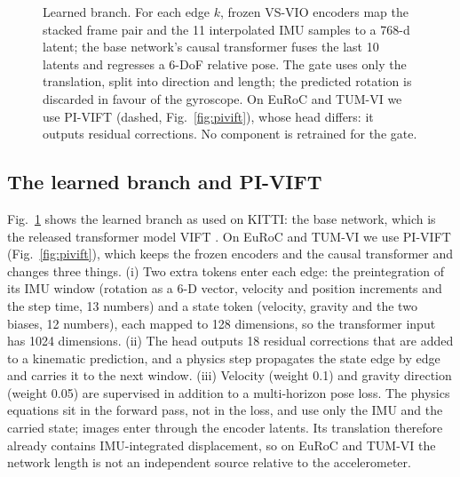 \documentclass[letterpaper,journal]{IEEEtran}
\newcommand{\dnet}{\mathbf{d}_{\mathrm{net}}}
\begin{document}
\begin{figure}[t]
{}
\caption{Learned branch. For each edge $k$, frozen VS-VIO encoders map the stacked frame pair and the 11 interpolated IMU samples to a 768-d latent; the base network's causal transformer fuses the last 10 latents and regresses a 6-DoF relative pose. The gate uses only the translation, split into direction and length; the predicted rotation is discarded in favour of the gyroscope. On EuRoC and TUM-VI we use PI-VIFT (dashed, Fig.~\ref{fig:pivift}), whose head differs: it outputs residual corrections. No component is retrained for the gate.}
\label{fig:net}
\end{figure}

\subsection{The learned branch and PI-VIFT}
\label{sec:learned}
Fig.~\ref{fig:net} shows the learned branch as used on KITTI: the base network, which is the released transformer model VIFT \cite{Kurt2024}. On EuRoC and TUM-VI we use PI-VIFT (Fig.~\ref{fig:pivift}), which keeps the frozen encoders and the causal transformer and changes three things. (i) Two extra tokens enter each edge: the preintegration of its IMU window (rotation as a 6-D vector, velocity and position increments and the step time, 13 numbers) and a state token (velocity, gravity and the two biases, 12 numbers), each mapped to 128 dimensions, so the transformer input has 1024 dimensions. (ii) The head outputs 18 residual corrections that are added to a kinematic prediction, and a physics step propagates the state edge by edge and carries it to the next window. (iii) Velocity (weight 0.1) and gravity direction (weight 0.05) are supervised in addition to a multi-horizon pose loss. The physics equations sit in the forward pass, not in the loss, and use only the IMU and the carried state; images enter through the encoder latents. Its translation therefore already contains IMU-integrated displacement, so on EuRoC and TUM-VI the network length is not an independent source relative to the accelerometer.
\end{document}
